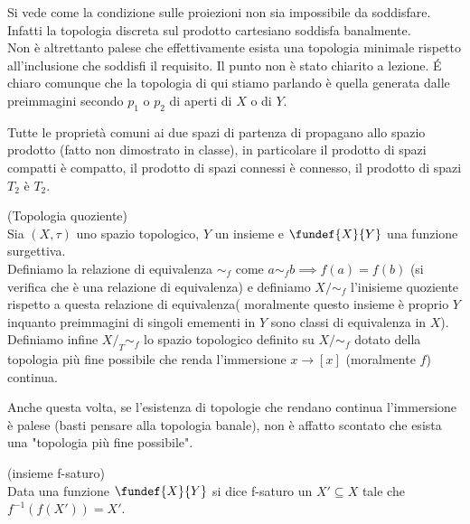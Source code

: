 \begin{oss}
Si vede come la condizione sulle proiezioni non sia impossibile da soddisfare. Infatti la topologia discreta sul prodotto cartesiano soddisfa banalmente.\\
Non è altrettanto palese che effettivamente esista una topologia minimale rispetto all'inclusione che soddisfi il requisito. Il punto non è stato chiarito a lezione. \'E chiaro comunque che la topologia di qui stiamo parlando è quella generata dalle preimmagini secondo $p_1$ o $p_2$ di aperti di $X$ o di $Y$.\\
\end{oss}

\begin{oss}
Tutte le proprietà comuni ai due spazi di partenza di propagano allo spazio prodotto (fatto non dimostrato in classe), in particolare il prodotto di spazi compatti è compatto, il prodotto di spazi connessi è connesso, il prodotto di spazi $T_2$ è $T_2$.
\end{oss}

\begin{defn}
(Topologia quoziente)\\
Sia $(X,\tau)$ uno spazio topologico, $Y$ un insieme e $\fundef{X}{Y}$ una funzione surgettiva. \\
Definiamo la relazione di equivalenza $\sim_f$ come $a\sim_f b \implies f(a)=f(b)$ (si verifica che è una relazione di equivalenza) e definiamo $X/\sim_f$ l'inisieme quoziente rispetto a questa relazione di equivalenza( moralmente questo insieme è proprio $Y$ inquanto preimmagini di singoli emementi in $Y$ sono classi di equivalenza in $X$).\\
Definiamo infine $X/_T \sim_f$ lo spazio topologico definito su $X/\sim_f$ dotato della topologia più fine possibile che renda l'immersione $x \rightarrow [x]$ (moralmente $f$) continua.
\end{defn}

\begin{oss}
Anche questa volta, se l'esistenza di topologie che rendano continua l'immersione è palese (basti pensare alla topologia banale), non è affatto scontato che esista una "topologia più fine possibile".\\
\end{oss}

\begin{defn}
(insieme f-saturo)\\
Data una funzione $\fundef{X}{Y}$ si dice f-saturo un $X'\subseteq X$ tale che $f^{-1}(f(X'))=X'$.
\end{defn}

